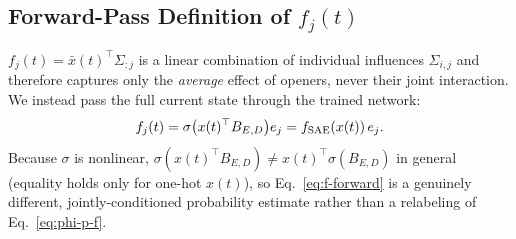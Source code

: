 \subsection{Forward-Pass Definition of $f_j(t)$}
\label{sec:forward-f}

$f_j(t) = \bar x(t)^\top\Sigma_{:j}$ is a linear combination of individual
influences $\Sigma_{i,j}$ and therefore captures only the \emph{average}
effect of openers, never their joint interaction. We instead pass the full
current state through the trained network:
\begin{equation}
\label{eq:f-forward}
f_j(t) = \sigma\big(x(t)^\top B_{E,D}\big)e_j = f_{\mathrm{SAE}}(x(t))\,e_j.
\end{equation}
Because $\sigma$ is nonlinear, $\sigma(x(t)^\top B_{E,D}) \ne
x(t)^\top\sigma(B_{E,D})$ in general (equality holds only for one-hot
$x(t)$), so Eq.~\eqref{eq:f-forward} is a genuinely different,
jointly-conditioned probability estimate rather than a relabeling of
Eq.~\eqref{eq:phi-p-f}.
